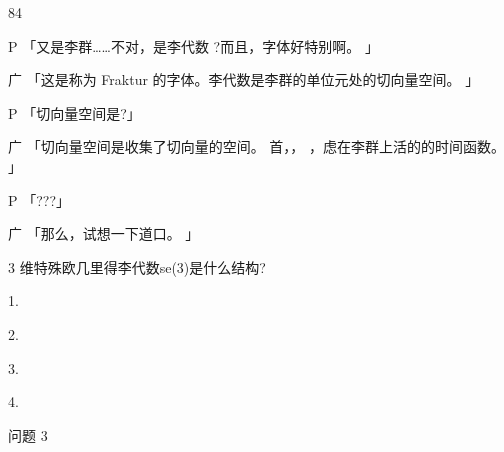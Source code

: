 84\par
P 「又是李群……不对，是李代数 ?而且，字体好特别啊。 」\par
广 「这是称为 Fraktur 的字体。李代数是李群的单位元处的切向量空间。 」\par
P 「切向量空间是?」\par
广 「切向量空间是收集了切向量的空间。 首，， ，虑在李群上活的的时间函数。 」\par
P 「???」\par
广 「那么，试想一下道口。 」\par
3 维特殊欧几里得李代数se(3)是什么结构?\par
1.\par
[\par
0 x1 x2 y1\par
x1 0 x3 y2\par
x2 x3 0 y3\par
0 0 0 0 ]\par
2.\par
[\par
1 x1 x2 y1\par
x1 1 x3 y2\par
x2 x3 1 y3\par
0 0 0 1 ]\par
3.\par
[\par
0 x1 x2 y1\par
-x1 0 x3 y2\par
-x2 -x3 0 y3\par
0 0 0 0 ]\par
4.\par
[\par
1 x1 x2 y1\par
-x1 1 x3 y2\par
-x2 -x3 1 y3\par
0 0 0 1 ]\par
问题 3\par

